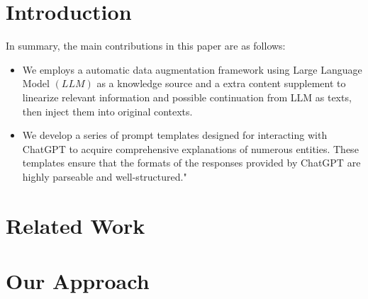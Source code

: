 \documentclass[mathematics,article,submit,moreauthors]{Definitions/mdpi}
\newcommand{\1}[1]{\mathds{1}\left[#1\right]}
\begin{document}

\section{Introduction}
\label{sec:intro}

In summary, the main contributions in this paper are as follows:
\begin{itemize}
	\item We employs a automatic data augmentation framework using Large Language Model \((LLM)\) as a knowledge source and a extra content supplement to linearize relevant information and possible continuation from LLM as texts, then inject them into original contexts. 

	\item We develop a series of prompt templates designed for interacting with ChatGPT to acquire comprehensive explanations of numerous entities. These templates ensure that the formats of the responses provided by ChatGPT are highly parseable and well-structured."
\end{itemize}

\section{Related Work}
\label{sec:related}


\section{Our Approach}
\end{document}
